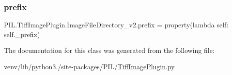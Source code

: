 \subsubsection{\texorpdfstring{prefix}{prefix}}
{\footnotesize\ttfamily P\+I\+L.\+Tiff\+Image\+Plugin.\+Image\+File\+Directory\+\_\+v2.\+prefix = property(lambda self\+: self.\+\_\+prefix)\hspace{0.3cm}{\ttfamily [static]}}



The documentation for this class was generated from the following file\+:\begin{DoxyCompactItemize}
\item 
venv/lib/python3./site-\/packages/\+P\+I\+L/\hyperlink{TiffImagePlugin_8py}{Tiff\+Image\+Plugin.\+py}\end{DoxyCompactItemize}
